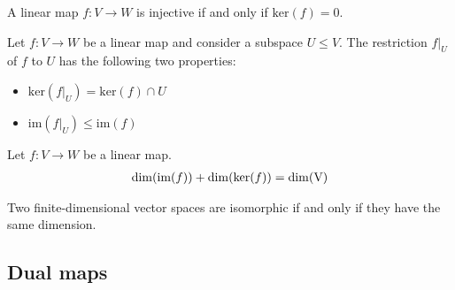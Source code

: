 
    \begin{property}
        A linear map $f:V\rightarrow W$ is injective if and only if $\text{ker}(f) = 0$.
    \end{property}
    \begin{property}
        Let $f:V\rightarrow W$ be a linear map and consider a subspace $U\leq V$. The restriction $f|_U$ of $f$ to $U$ has the following two properties:
        \begin{itemize}
            \item $\text{ker}\left(f|_U\right) = \text{ker}(f)\cap U$
            \item $\text{im}\left(f|_U\right) \leq \text{im}(f)$
        \end{itemize}
    \end{property}

    \begin{theorem}\label{linalgebra:dimension_theorem}
        Let $f: V \rightarrow W$ be a linear map.
        \begin{gather}
            \dim(\text{\upshape im}(f)) + \dim(\text{\upshape ker}(f)) = \dim(\text{\upshape V})
        \end{gather}
    \end{theorem}
    \begin{result}
        Two finite-dimensional vector spaces are isomorphic if and only if they have the same dimension.
    \end{result}

\subsection{Dual maps}

